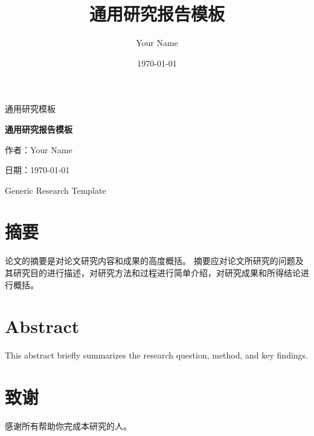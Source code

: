 \documentclass[degree=master,fontset=mac]{thuthesis}
\title{通用研究报告模板}
\author{Your Name}
\date{\today}
\begin{document}
\begin{titlepage}
  \centering
  {\LARGE 通用研究模板\par}
  \vspace{1.5cm}
  {\huge\bfseries 通用研究报告模板\par}
  \vspace{1.5cm}
  {\large 作者：Your Name\par}
  \vspace{0.5cm}
  {\large 日期：\today\par}
  \vfill
  {\large Generic Research Template\par}
\end{titlepage}

\frontmatter
\chapter*{摘要}
论文的摘要是对论文研究内容和成果的高度概括。
摘要应对论文所研究的问题及其研究目的进行描述，对研究方法和过程进行简单介绍，对研究成果和所得结论进行概括。

\chapter*{Abstract}
This abstract briefly summarizes the research question, method, and key findings.

\tableofcontents
\listoffigures
\listoftables

\mainmatter







\appendix


\backmatter
\chapter*{致谢}
感谢所有帮助你完成本研究的人。
\end{document}

